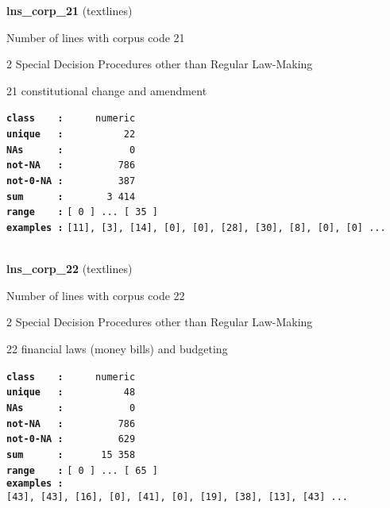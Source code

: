 \documentclass[]{article}
\begin{document}
\textbf{lns\_corp\_21} (textlines)

Number of lines with corpus code 21

2 Special Decision Procedures other than Regular Law-Making

21 constitutional change and amendment

\textbf{\texttt{class\ \ \ \ :}} \texttt{~~~~~numeric}\\
\textbf{\texttt{unique\ \ \ :}} \texttt{~~~~~~~~~~22}\\
\textbf{\texttt{NAs\ \ \ \ \ \ :}} \texttt{~~~~~~~~~~~0}\\
\textbf{\texttt{not-NA\ \ \ :}} \texttt{~~~~~~~~~786}\\
\textbf{\texttt{not-0-NA\ :}} \texttt{~~~~~~~~~387}\\
\textbf{\texttt{sum\ \ \ \ \ \ :}} \texttt{~~~~~~~3~414}\\
\textbf{\texttt{range\ \ \ \ :}}
\texttt{{[}\ 0\ {]}\ ...\ {[}\ 35\ {]}}\\
\textbf{\texttt{examples\ :}}
\texttt{{[}11{]},\ {[}3{]},\ {[}14{]},\ {[}0{]},\ {[}0{]},\ {[}28{]},\ {[}30{]},\ {[}8{]},\ {[}0{]},\ {[}0{]}\ ...}\\

~

\textbf{lns\_corp\_22} (textlines)

Number of lines with corpus code 22

2 Special Decision Procedures other than Regular Law-Making

22 financial laws (money bills) and budgeting

\textbf{\texttt{class\ \ \ \ :}} \texttt{~~~~~numeric}\\
\textbf{\texttt{unique\ \ \ :}} \texttt{~~~~~~~~~~48}\\
\textbf{\texttt{NAs\ \ \ \ \ \ :}} \texttt{~~~~~~~~~~~0}\\
\textbf{\texttt{not-NA\ \ \ :}} \texttt{~~~~~~~~~786}\\
\textbf{\texttt{not-0-NA\ :}} \texttt{~~~~~~~~~629}\\
\textbf{\texttt{sum\ \ \ \ \ \ :}} \texttt{~~~~~~15~358}\\
\textbf{\texttt{range\ \ \ \ :}}
\texttt{{[}\ 0\ {]}\ ...\ {[}\ 65\ {]}}\\
\textbf{\texttt{examples\ :}}
\texttt{{[}43{]},\ {[}43{]},\ {[}16{]},\ {[}0{]},\ {[}41{]},\ {[}0{]},\ {[}19{]},\ {[}38{]},\ {[}13{]},\ {[}43{]}\ ...}\\

~
\end{document}

